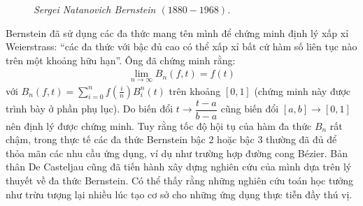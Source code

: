\begin{multicols}{2}
\begin{figure}[H]
		\caption{\small\textit{\color{toanhocdoisong}Sergei Natanovich Bernstein $(1880-1968)$.}}
		\vspace*{-10pt}
	\end{figure}
	Bernstein đã sử dụng các đa thức mang tên mình để chứng minh định lý xấp xỉ Weierstrass: ``các đa thức với bậc đủ cao có thể xấp xỉ bất cứ hàm số liên tục nào trên một khoảng hữu hạn''. Ông đã chứng minh rằng:
	\begin{align*}
		\mathop {\lim }\limits_{n \to \infty } {B_n}(f,t) = f(t)
	\end{align*}
	với $B_n(f,t) = \sum\limits_{i = 0}^n {f\left( {\frac{i}{n}} \right)B_i^n(t)}$ trên khoảng $[0,1]$ (chứng minh này được trình bày ở phần phụ lục). Do biến đổi $t \to \dfrac{t-a}{b-a}$ cũng biến đổi $[a,b] \to [0,1]$ nên định lý được chứng minh.
	\vskip 0.1cm
	Tuy rằng tốc độ hội tụ của hàm đa thức $B_n$ rất chậm, trong thực tế các đa thức Bernstein bậc $2$ hoặc bậc $3$ thường đã đủ để thỏa mãn các nhu cầu ứng dụng, ví dụ như trường hợp đường cong Bézier. Bản thân De Casteljau cũng đã tiến hành xây dựng nghiên cứu của mình dựa trên lý thuyết về đa thức Bernstein. Có thể thấy rằng những nghiên cứu toán học tưởng như trừu tượng lại nhiều lúc tạo cơ sở cho những ứng dụng thực tiễn đầy thú vị.
	\vskip 0.1cm
\end{multicols}
